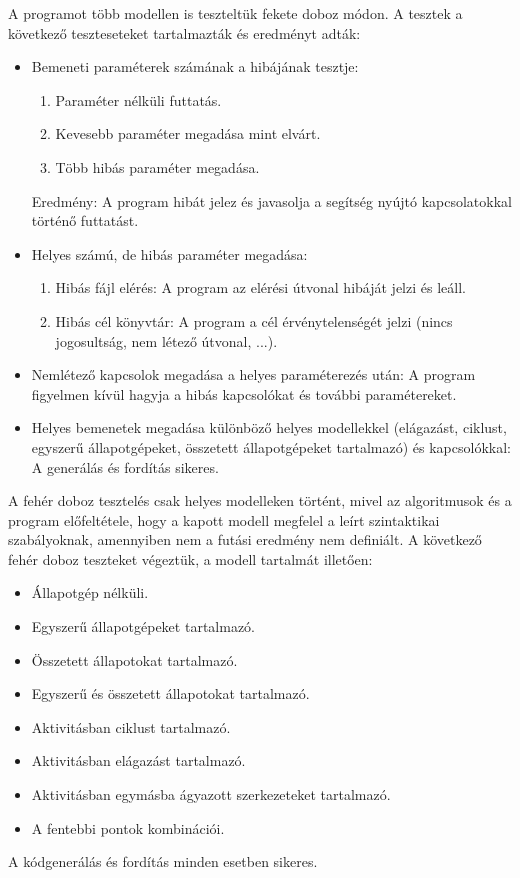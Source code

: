 \documentclass[a4paper,12pt]{report}
\begin{document}
A programot több modellen is teszteltük fekete doboz módon. A tesztek a következő teszteseteket tartalmazták és eredményt adták:
\begin{itemize}
\item Bemeneti paraméterek számának a hibájának tesztje:
\begin{enumerate}
\item Paraméter nélküli futtatás.
\item Kevesebb paraméter megadása mint elvárt.
\item Több hibás paraméter megadása.
\end{enumerate}
Eredmény: A program hibát jelez és javasolja a segítség nyújtó kapcsolatokkal történő futtatást.

\item Helyes számú, de hibás paraméter megadása:
\begin{enumerate}
\item Hibás fájl elérés: A program az elérési útvonal hibáját jelzi és leáll.
\item Hibás cél könyvtár: A program a cél érvénytelenségét jelzi (nincs jogosultság, nem létező útvonal, ...).
\end{enumerate}

\item Nemlétező kapcsolok megadása a helyes paraméterezés után: A program figyelmen kívül hagyja a hibás kapcsolókat és további paramétereket.
\item Helyes bemenetek megadása különböző helyes modellekkel (elágazást, ciklust, egyszerű állapotgépeket, összetett állapotgépeket tartalmazó) és kapcsolókkal: A generálás és fordítás sikeres.
\end{itemize}

A fehér doboz tesztelés csak helyes modelleken történt, mivel az algoritmusok és a program előfeltétele, hogy a kapott modell megfelel a leírt szintaktikai szabályoknak, amennyiben nem a futási eredmény nem definiált.
A következő fehér doboz teszteket végeztük, a modell tartalmát illetően:
\begin{itemize}
\item Állapotgép nélküli.
\item Egyszerű állapotgépeket tartalmazó.
\item Összetett állapotokat tartalmazó.
\item Egyszerű és összetett állapotokat tartalmazó.
\item Aktivitásban ciklust tartalmazó.
\item Aktivitásban elágazást tartalmazó.
\item Aktivitásban egymásba ágyazott szerkezeteket tartalmazó.
\item A fentebbi pontok kombinációi.
\end{itemize} 
A kódgenerálás és fordítás minden esetben sikeres.

\nocite{*}


\end{document}
